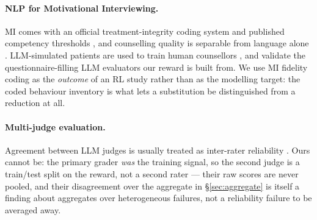 \paragraph{NLP for Motivational Interviewing.} MI comes with an official treatment-integrity
coding system and published competency thresholds \citep{moyers2016miti}, and counselling quality
is separable from language alone \citep{perezrosas2019goodcounselor}. LLM-simulated patients are
used to train human counsellors \citep{steenstra2025scaffolding}, and \citet{yosef2024assessing}
validate the questionnaire-filling LLM evaluators our reward is built from. We use MI fidelity
coding as the \emph{outcome} of an RL study rather than as the modelling target: the coded
behaviour inventory is what lets a substitution be distinguished from a reduction at all.

\paragraph{Multi-judge evaluation.} Agreement between LLM judges is usually treated as
inter-rater reliability \citep{zheng2023judging,koo2016icc}. Ours cannot be: the primary grader
\emph{was} the training signal, so the second judge is a train/test split on the reward, not a
second rater --- their raw scores are never pooled, and their disagreement over the aggregate in
\S\ref{sec:aggregate} is itself a finding about aggregates over heterogeneous failures, not a
reliability failure to be averaged away.

